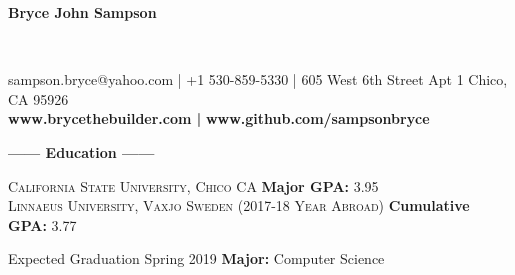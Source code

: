 \documentclass[12pt]{article}
\begin{document}
\sffamily
\lsstyle
\color{white}
\center
\begin{Huge}\textbf{Bryce John Sampson}\end{Huge}\\
\medskip
\fontsize{12}{1.2}
\selectfont
\smallbreak
\colorbox{accent}{
    \parbox{45em}{
        \centering
        \color{secondary}
        sampson.bryce@yahoo.com | +1 530-859-5330 | 605 West 6th Street Apt 1 Chico, CA 95926 \\
        \large
        \textbf{\color{primary}www.brycethebuilder.com |}
        \textbf{\color{primary}www.github.com/sampsonbryce}
    }
}
\smallskip
\center
\textbf{\Large------ Education ------}\\
\flushleft
\begin{footnotesize}
\textsc{California State University, Chico CA}
\hfill
\textbf{\color{primary}Major GPA: }3.95\\

\smallskip
\textsc{Linnaeus University, Vaxjo Sweden (2017-18 Year Abroad)}
\hfill
\textbf{\color{primary}Cumulative GPA: }3.77\\
\smallskip

{\color{accent}Expected Graduation Spring 2019}
\hfill
\textbf{\color{primary}Major: }Computer Science\\
\smallskip

\end{footnotesize}
\end{document}
